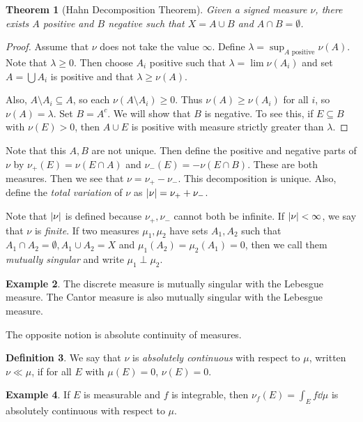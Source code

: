 \documentclass[leqno, openany]{memoir}
\newtheorem{thm}{Theorem}[chapter]
\theoremstyle{definition}
\newtheorem{defn}[thm]{Definition}
\newtheorem{exm}[thm]{Example}
\theoremstyle{remark}
\theoremstyle{plain}
\theoremstyle{definition}
\theoremstyle{remark}
\begin{document}
\begin{thm}[Hahn Decomposition Theorem] Given a signed measure $\nu$, there
exists $A$ positive and $B$ negative such that $X = A \cup B$ and $A \cap B =
\emptyset$.  \end{thm}

\begin{proof} Assume that $\nu$ does not take the value $\infty$. Define
    $\lambda = \sup_{A \text{ positive}} \nu(A)$. Note that $\lambda \geq 0$.
    Then choose $A_i$ positive such that $\lambda = \lim \nu(A_i)$ and set $A =
    \bigcup A_i$ is positive and that $\lambda \geq \nu(A)$.

    Also, $A \setminus A_i \subseteq A$, so each $\nu(A \setminus A_i) \geq 0$.
Thus $\nu(A) \geq \nu(A_i)$ for all $i$, so $\nu(A) = \lambda$. Set $B = A^c$.
We will show that $B$ is negative. To see this, if $E \subseteq B$ with $\nu(E)
> 0$, then $A \cup E$ is positive with measure strictly greater than $\lambda$.
\end{proof}

Note that this $A,B$ are not unique. Then define the positive and negative
parts of $\nu$ by $\nu_+(E) = \nu(E \cap A)$ and $\nu_-(E) = - \nu(E \cap B)$.
These are both measures. Then we see that $\nu = \nu_+ - \nu_-$. This
decomposition is unique. Also, define the \textit{total variation} of $\nu$ as
$\abs{\nu} = \nu_+ + \nu_-$.

Note that $\abs{\nu}$ is defined because $\nu_+, \nu_-$ cannot both be
infinite. If $\abs{\nu} < \infty$, we say that $\nu$ is \textit{finite}. If two
measures $\mu_1, \mu_2$ have sets $A_1, A_2$ such that $A_1 \cap A_2 =
\emptyset, A_1 \cup A_2 = X$ and $\mu_1(A_2) = \mu_2(A_1) = 0$, then we call
them \textit{mutually singular} and write $\mu_1 \perp \mu_2$.

\begin{exm} The discrete measure is mutually singular with the Lebesgue
measure. The Cantor measure is also mutually singular with the Lebesgue
measure.  \end{exm}

The opposite notion is absolute continuity of measures.  \begin{defn} We say
that $\nu$ is \textit{absolutely continuous} with respect to $\mu$, written
$\nu \ll \mu$, if for all $E$ with $\mu(E) = 0$, $\nu(E) = 0$.  \end{defn}

\begin{exm} If $E$ is measurable and $f$ is integrable, then $\nu_f(E) = \int_E
f \dd{\mu}$ is absolutely continuous with respect to $\mu$.  \end{exm}
\end{document}
